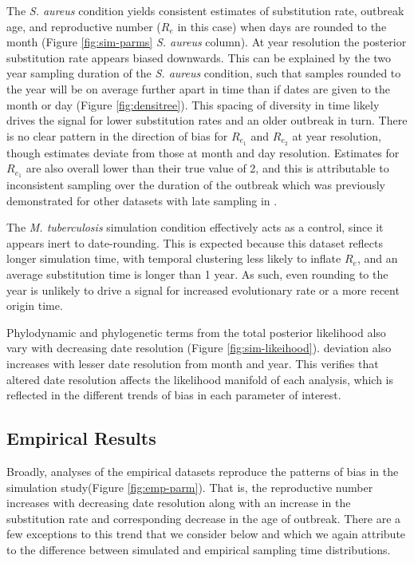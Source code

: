\documentclass[12pt]{article}
\begin{document}
\begin{spacing}{2}
The \textit{S. aureus} condition yields consistent estimates of substitution rate, outbreak age, and reproductive number ($R_e$ in this case) when days are rounded to the month (Figure \ref{fig:sim-parms} \textit{S. aureus} column). At year resolution the posterior substitution rate appears biased downwards. This can be explained by the two year sampling duration of the \textit{S. aureus} condition, such that samples rounded to the year will be on average further apart in time than if dates are given to the month or day (Figure \ref{fig:densitree}). This spacing of diversity in time likely drives the signal for lower substitution rates and an older outbreak in turn. There is no clear pattern in the direction of bias for $R_{e_1}$ and $R_{e_2}$ at year resolution, though estimates deviate from those at month and day resolution. Estimates for $R_{e_1}$ are also overall lower than their true value of 2, and this is attributable to inconsistent sampling over the duration of the outbreak which was previously demonstrated for other datasets with late sampling in \cite{featherstone_infectious_2021}.

The \textit{M. tuberculosis} simulation condition effectively acts as a control, since it appears inert to date-rounding. This is expected because this dataset reflects longer simulation time, with temporal clustering less likely to inflate $R_e$, and an average substitution time is longer than 1 year. As such, even rounding to the year is unlikely to drive a signal for increased evolutionary rate or a more recent origin time.

Phylodynamic and phylogenetic terms from the total posterior likelihood also vary with decreasing date resolution (Figure \ref{fig:sim-likeihood}). deviation also increases with lesser date resolution from month and year. This verifies that altered date resolution affects the likelihood manifold of each analysis, which is reflected in the different trends of bias in each parameter of interest.

\subsection*{Empirical Results}
Broadly, analyses of the empirical datasets reproduce the patterns of bias in the simulation study(Figure \ref{fig:emp-parm}). That is, the reproductive number increases with decreasing date resolution along with an increase in the substitution rate and corresponding decrease in the age of outbreak. There are a few exceptions to this trend that we consider below and which we again attribute to the difference between simulated and empirical sampling time distributions.


\end{spacing}
\end{document}
